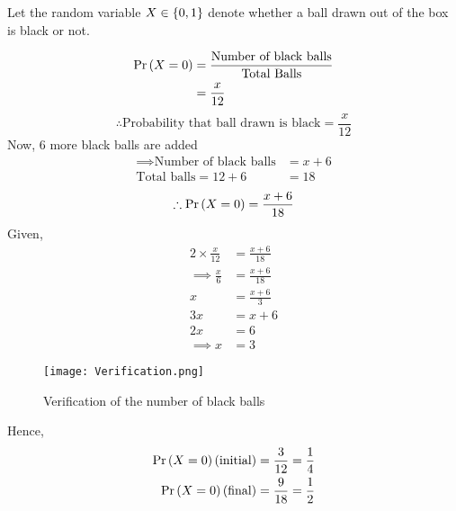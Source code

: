 \documentclass[journal,12pt,two column]{IEEEtran}
\begin{document}
\solution
Let the random variable $X \in \left\{0,1\right\}$ denote whether a ball drawn out of the box is black or not.
\begin{table}[ht!]
    \centering
    
    \caption{}
    \label{Table 1}
\end{table}
\begin{align}
 \Pr\left(X = 0\right) &= \dfrac{\text{Number of black balls}}{\text{Total Balls}}\\
            &= \frac{x}{12}
\end{align}
\begin{equation}
    \therefore \text{Probability that ball drawn is black} = \frac{x}{12}
\end{equation}
Now, 6 more black balls are added
\begin{align}
    \implies \text{Number of black balls} &= x + 6 \\
    \text{Total balls} = 12 + 6 &= 18
\end{align}
\begin{equation}
   \therefore \Pr\left(X = 0\right) = \frac{x + 6}{18}
\end{equation}
Given,
\begin{align}
    2\times\frac{x}{12} &= \frac{x + 6}{18}\\
    \implies \frac{x}{6} &= \frac{x + 6}{18}\\
     x &= \frac{x + 6}{3}\\
     3x &= x + 6 \\
     2x &= 6 \\
     \implies x &= 3
\end{align}
\begin{figure}[!ht]
     \centering
     \texttt{[image: Verification.png]}
     \caption{Verification of the number of black balls}
     \label{fig:Figure 2}
\end{figure}

Hence,
\begin{align}
    \Pr\left(X = 0\right)\text{(initial)} &= \frac{3}{12} = \frac{1}{4}\\
    \Pr\left(X = 0\right)\text{(final)} &= \frac{9}{18} = \frac{1}{2}
\end{align}
\end{document}
